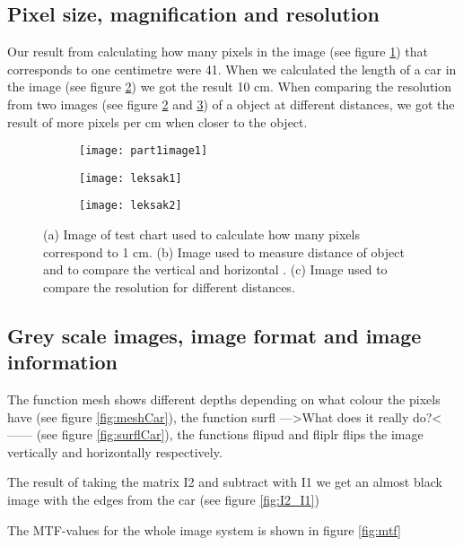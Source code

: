 \subsection{Pixel size, magnification and resolution}
Our result from calculating how many pixels in the image (see figure \ref{fig:TestChart}) that corresponds to one centimetre were 41. When we calculated the length of a car in the image (see figure \ref{fig:Toy1}) we got the result 10 cm. When comparing the resolution from two images (see figure \ref{fig:Toy1} and \ref{fig:Toy2}) of a object at different distances, we got the result of more pixels per cm when closer to the object.

\begin{figure}[h]
	\centering
	\begin{subfigure}[b]{0.3\textwidth}
		\texttt{[image: part1image1]}
		\caption{}
		\label{fig:TestChart}
	\end{subfigure}
	\begin{subfigure}[b]{0.3\textwidth}
		\texttt{[image: leksak1]}
		\caption{}
		\label{fig:Toy1}
	\end{subfigure}
	\begin{subfigure}[b]{0.3\textwidth}
		\texttt{[image: leksak2]}
		\caption{}
		\label{fig:Toy2}
	\end{subfigure}
	\caption{(a) Image of test chart used to calculate how many pixels correspond to 1 cm. (b) Image used to measure distance of object and to compare the vertical and horizontal . (c) Image used to compare the resolution for different distances.}
	\label{fig:part1}
\end{figure}

\subsection{Grey scale images, image format and image information}
The function mesh shows different depths depending on what colour the pixels have (see figure \ref{fig:meshCar}), the function surfl --->What does it really do?<------ (see figure \ref{fig:surflCar}), the functions flipud and fliplr flips the image vertically and horizontally respectively. 

The result of taking the matrix I2 and subtract with I1 we get an almost black image with the edges from the car (see figure \ref{fig:I2_I1})

The MTF-values for the whole image system is shown in figure \ref{fig:mtf}

